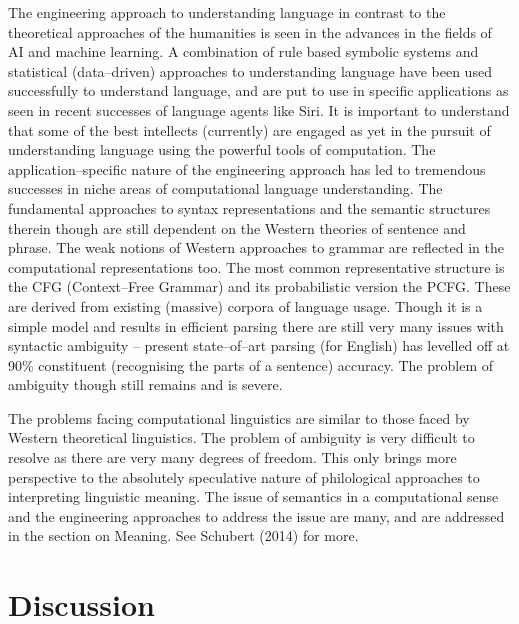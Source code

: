 The engineering approach to understanding language in contrast to the theoretical approaches of the humanities is seen in the advances in the fields of AI and machine learning. A combination of rule based symbolic systems and statistical (data–driven) approaches to understanding language have been used successfully to understand language, and are put to use in specific applications as seen in recent successes of language agents like Siri. It is important to understand that some of the best intellects (currently) are engaged as yet in the pursuit of understanding language using the powerful tools of computation. The application–specific nature of the engineering approach has led to tremendous successes in niche areas of computational language understanding. The fundamental approaches to syntax representations and the semantic structures therein though are still dependent on the Western theories of sentence and phrase. The weak notions of Western approaches to grammar are reflected in the computational representations too. The most common representative structure is the CFG (Context–Free Grammar) and its probabilistic version the PCFG. These are derived from existing (massive) corpora of language usage. Though it is a simple model and results in efficient parsing there are still very many issues with syntactic ambiguity – present state–of–art parsing (for English) has levelled off at 90\% constituent (recognising the parts of a sentence) accuracy. The problem of ambiguity though still remains and is severe.

The problems facing computational linguistics are similar to those faced by Western theoretical linguistics. The problem of ambiguity is very difficult to resolve as there are very many degrees of freedom. This only brings more perspective to the absolutely speculative nature of philological approaches to interpreting linguistic meaning. The issue of semantics in a computational sense and the engineering approaches to address the issue are many, and are addressed in the section on Meaning. See Schubert (2014) for more.


\section*{Discussion}

